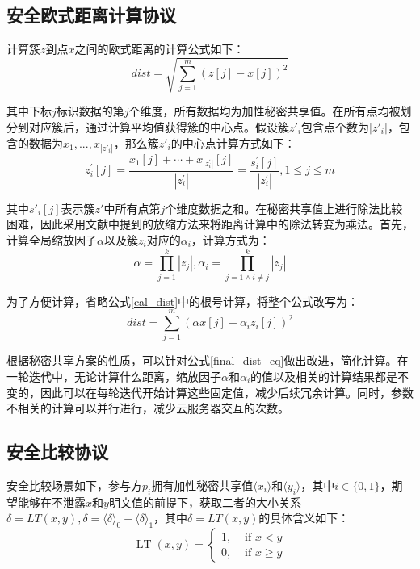 \subsection{安全欧式距离计算协议}

计算簇$z$到点$x$之间的欧式距离的计算公式如下：
\begin{equation}
	\label{cal_dist}
	dist=\sqrt{\sum_{j=1}^m\left(z[j]-x[j]\right)^2}
\end{equation}

其中下标$j$标识数据的第$j$个维度，所有数据均为加性秘密共享值。在所有点均被划分到对应簇后，通过计算平均值获得簇的中心点。假设簇$z'_i$包含点个数为$|z'_i|$，包含的数据为${x_1,...,x_{|z'_i|}}$，那么簇$z'_i$的中心点计算方式如下：
\begin{equation}
	\label{cal_center}
	z_{i}^{\prime}[j]=\frac{x_{1}[j]+\cdots+x_{\left|z_{i}^{\prime}\right|}[j]}{\left|z_{i}^{\prime}\right|}=\frac{s_{i}^{\prime}[j]}{\left|z_{i}^{\prime}\right|}, 1 \leq j \leq m
\end{equation}

其中$s'_i[j]$表示簇$z'$中所有点第$j$个维度数据之和。在秘密共享值上进行除法比较困难，因此采用文献\cite{wu2020secure}中提到的放缩方法来将距离计算中的除法转变为乘法。首先，计算全局缩放因子$\alpha$以及簇$z_i$对应的$\alpha_i$，计算方式为：
\begin{equation}
	\label{cal_scale}
	\alpha=\prod_{j=1}^{k}\left|z_{j}\right|, \alpha_{i}=\prod_{j=1 \wedge i \neq j}^{k}\left|z_{j}\right|
\end{equation}

为了方便计算，省略公式\ref{cal_dist}中的根号计算，将整个公式改写为：
\begin{equation}
	\label{final_dist_eq}
	dist = \sum_{j=1}^{m}(\alpha x[j] - \alpha_{i}z_i[j])^2
\end{equation}

根据秘密共享方案的性质，可以针对公式\ref{final_dist_eq}做出改进，简化计算。在一轮迭代中，无论计算什么距离，缩放因子$\alpha$和$\alpha_i$的值以及相关的计算结果都是不变的，因此可以在每轮迭代开始计算这些固定值，减少后续冗余计算。同时，参数不相关的计算可以并行进行，减少云服务器交互的次数。

\subsection{安全比较协议}
\label{s3-securecomparison}
安全比较场景如下，参与方$p_i$拥有加性秘密共享值$\langle x_i \rangle$和$\langle y_i \rangle$，其中$i \in \{0, 1\}$，期望能够在不泄露$x$和$y$明文值的前提下，获取二者的大小关系$\delta = LT(x, y), \delta = \langle \delta \rangle_0 + \langle \delta \rangle_1$，其中$\delta = LT(x, y)$的具体含义如下：
\begin{equation}
	\operatorname{LT}(x, y)= \begin{cases}1, & \text { if } x<y \\ 0, & \text { if } x \geq y\end{cases}
\end{equation}

